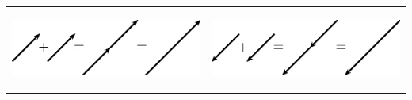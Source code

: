         \begin{center}
      
      \label{m38813*id188703}
      
    \noindent
      \tablelasttail{}
      \begin{xtabular*}{\mytablewidth}[t]{|p{10\mystarwidth}|p{10\mystarwidth}|}\hline
    
    
        
                  
    \setcounter{subfigure}{0}

\label{m38813*id188711}
    \begin{center}
    \label{m38813*id188711!!!underscore!!!media}\label{m38813*id188711!!!underscore!!!printimage}\includegraphics[width=300px]{col11305.imgs/m38813_PG11C1_022.png} %
        
      \vspace{2pt}
    \vspace{.1in}
    
    \end{center}



    \addtocounter{footnote}{-0}
    
                 &
    
    
        
                  
    \setcounter{subfigure}{0}

\label{m38813*id188721}
    \begin{center}
    \label{m38813*id188721!!!underscore!!!media}\label{m38813*id188721!!!underscore!!!printimage}\includegraphics[width=300px]{col11305.imgs/m38813_PG11C1_023.png} %
        

\end{center}
\end{xtabular*}
\end{center}
